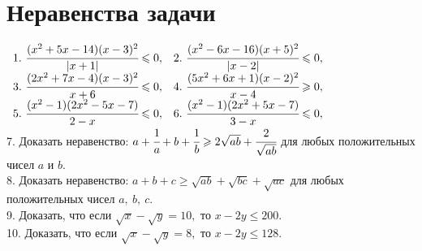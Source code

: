 \documentclass[12pt]{article}
\begin{document}
\section{Неравенства задачи}
$\begin{array}{ll}
1.\ \cfrac{(x^2+5x-14)(x-3)^2}{|x+1|}\leqslant0,&
2.\ \cfrac{(x^2-6x-16)(x+5)^2}{|x-2|}\leqslant0,\\
3.\ \cfrac{(2x^2+7x-4)(x-3)^2}{x+6}\leqslant0,&
4.\ \cfrac{(5x^2+6x+1)(x-2)^2}{x-4}\geqslant0,\\
5.\ \cfrac{(x^2-1)(2x^2-5x-7)}{2-x}\leqslant0,&
6.\ \cfrac{(x^2-1)(2x^2+5x-7)}{3-x}\leqslant0,
\end{array}$\\
7. Доказать неравенство: $a+\cfrac{1}{a}+b+\cfrac{1}{b}\geqslant2\sqrt{ab}+\cfrac{2}{\sqrt{ab}}$ для любых положительных чисел $a$ и $b.$\\
8. Доказать неравенство: $a+b+c\geqslant\sqrt{ab}+\sqrt{bc}+\sqrt{ac}$ для любых положительных чисел $a,\ b,\ c.$\\
9. Доказать, что если $\sqrt{x}-\sqrt{y}=10,$ то $x-2y\leqslant 200.$\\
10. Доказать, что если $\sqrt{x}-\sqrt{y}=8,$ то $x-2y\leqslant128.$\\
\end{document}

